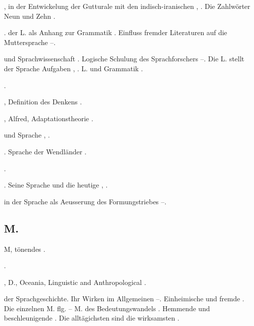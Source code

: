 \begin{register}
,  in der Entwickelung der Gutturale mit den indisch-iranischen \pageref{sp.159}, \pageref{sp.163}. Die Zahlwörter Neun und Zehn \pageref{sp.401}.

.  der L. als Anhang zur Grammatik \pageref{sp.107}. Einfluss fremder Literaturen auf die Muttersprache \pageref{sp.274}–\pageref{sp.275}.


 und Sprachwissenschaft \pageref{sp.14}. Logische Schulung des Sprachforschers \pageref{sp.47}–\pageref{sp.48}. Die L. stellt der Sprache Aufgaben \pageref{sp.48}, \pageref{sp.95}. L. und Grammatik \pageref{sp.448}.

 \pageref{sp.282}.

, Definition des Denkens \pageref{sp.6}.

, Alfred, Adaptationstheorie \pageref{sp.180}.

 und Sprache \pageref{sp.309}, \pageref{sp.310}.


. Sprache der Wendländer \pageref{sp.146}.

 \pageref{sp.257}.

 \pageref{sp.46}. Seine Sprache und die heutige \pageref{sp.139}, \pageref{sp.271}.

 in der Sprache als Aeusserung des Formungstriebes \pageref{sp.361}–\pageref{sp.364}.


\subsection*{M.}\label{reg.M}

M, tönendes \pageref{sp.186}.

 \pageref{sp.282}.

, D., Oceania, Linguistic and Anthropological \pageref{sp.162}.

 der Sprachgeschichte. Ihr Wirken im Allgemeinen \pageref{sp.168}–\pageref{sp.169}. Einheimische und fremde \pageref{sp.177}. Die einzelnen M. \pageref{sp.181} flg. – M. des Bedeutungswandels \pageref{sp.232}. Hemmende und beschleunigende \pageref{sp.258}. Die alltäg\pageref{sp.1}ichsten sind die wirksamsten \pageref{sp.259}.


\end{register}
